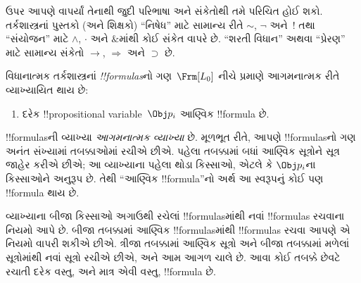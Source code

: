 \documentclass[../../../include/open-logic-section]{subfiles}
\begin{document}

\begin{intro}
ઉપર આપણે વાપર્યાં તેનાથી જુદી પરિભાષા અને સંકેતોથી તમે પરિચિત હોઈ
શકો. તર્કશાસ્ત્રનાં પુસ્તકો (અને શિક્ષકો) ``નિષેધ'' માટે સામાન્ય રીતે
$\sim$, $\neg$ અને~!\; તથા ``સંયોજન'' માટે $\wedge$, $\cdot$ અને
$\&$માંથી કોઈ સંકેત વાપરે છે. ``શરતી વિધાન'' અથવા ``પ્રેરણ'' માટે
સામાન્ય સંકેતો $\rightarrow$, $\Rightarrow$ અને $\supset$ છે.
\end{intro}

\begin{defn}[સૂત્ર]
વિધાનાત્મક તર્કશાસ્ત્રનાં \emph{!!{formula}s}નો ગણ~$\Frm[L_0]$
નીચે પ્રમાણે આગમનાત્મક રીતે વ્યાખ્યાયિત થાય છે:
\begin{enumerate}


\item દરેક !!{propositional variable}~$\Obj p_i$ આણ્વિક
  !!{formula} છે.






\end{enumerate}
\end{defn}

\begin{explain}
!!{formula}sની વ્યાખ્યા \emph{આગમનાત્મક વ્યાખ્યા} છે. મૂળભૂત રીતે,
આપણે !!{formula}sનો ગણ અનંત સંખ્યામાં તબક્કાઓમાં રચીએ છીએ. પહેલા
તબક્કામાં બધાં આણ્વિક સૂત્રોને સૂત્ર જાહેર કરીએ છીએ; આ વ્યાખ્યાના
પહેલા થોડા કિસ્સાઓ, એટલે કે
%
%
$\Obj p_i$ના કિસ્સાઓને અનુરૂપ છે. તેથી ``આણ્વિક !!{formula}''નો અર્થ
આ સ્વરૂપનું કોઈ પણ !!{formula} થાય છે.

વ્યાખ્યાના બીજા કિસ્સાઓ અગાઉથી રચેલાં !!{formula}sમાંથી નવાં
!!{formula}s રચવાના નિયમો આપે છે. બીજા તબક્કામાં આણ્વિક
!!{formula}sમાંથી !!{formula}s રચવા આપણે એ નિયમો વાપરી શકીએ છીએ.
ત્રીજા તબક્કામાં આણ્વિક સૂત્રો અને બીજા તબક્કામાં મળેલાં સૂત્રોમાંથી
નવાં સૂત્રો રચીએ છીએ, અને આમ આગળ ચાલે છે. આવા કોઈ તબક્કે છેવટે
રચાતી દરેક વસ્તુ, અને માત્ર એવી વસ્તુ, !!{formula} છે.
\end{explain}
\end{document}
